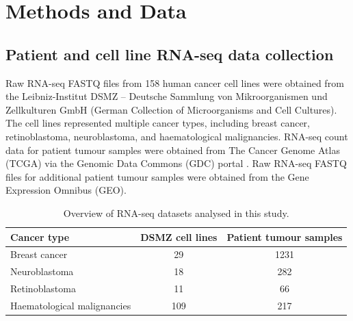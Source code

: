 \section{Methods and Data}

\subsection{Patient and cell line RNA-seq data collection}

Raw RNA-seq FASTQ files from 158 human cancer cell lines were obtained from the Leibniz-Institut DSMZ – Deutsche Sammlung von Mikroorganismen und Zellkulturen GmbH (German Collection of Microorganisms and Cell Cultures). The cell lines represented multiple cancer types, including breast cancer, retinoblastoma, neuroblastoma, and haematological malignancies. RNA-seq count data for patient tumour samples were obtained from The Cancer Genome Atlas (TCGA) via the Genomic Data Commons (GDC) portal \cite{Geistlinger_Ramos_curatedTCGADataRef_2025}. Raw RNA-seq FASTQ files for additional patient tumour samples were obtained from the Gene Expression Omnibus (GEO).

\begin{table}[H]
\centering
\caption{Overview of RNA-seq datasets analysed in this study.}
\label{tab:dataset_summary}
\begin{tabular}{lcc}
\toprule
Cancer type & DSMZ cell lines & Patient tumour samples \\
\midrule
Breast cancer & 29 & 1231 \\
Neuroblastoma & 18 & 282 \\
Retinoblastoma & 11 & 66 \\
Haematological malignancies & 109 & 217 \\
\bottomrule
\end{tabular}
\end{table}


